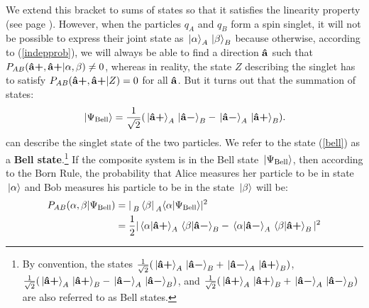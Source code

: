 %
We extend this bracket to sums of states so that it satisfies the linearity property (see page \pageref{linearity}).
However, when the particles $q_A$ and $q_B$ form a spin singlet, it will not be possible to express their joint state as $\ket*{\alpha}_A\ket*{\beta}_B$ because otherwise, according to (\ref{indepprob}), we will always be able to find a direction $\vb{\hat{{a}}}$ such that $P_{AB}({\vb{\hat{{a}}}\bm{+}}, {\vb{\hat{{a}}}\bm{+}}|\alpha, \beta)\neq 0$, whereas in reality, the state $Z$ describing the singlet has to satisfy $P_{AB}({\vb{\hat{{a}}}\bm{+}}, {\vb{\hat{{a}}}\bm{+}}|Z)=0$ for all  $\vb{\hat{{a}}}$.
But it turns out that the summation of states:
\begin{equation}\label{bell}
    \ket*{\Psi_{\text{Bell}}}=\frac{1}{\sqrt{2}}(\ket*{{\vb{\hat{{a}}}\bm{+}}}_A\ket*{{\vb{\hat{{a}}}\bm{-}}}_B-\ket*{{\vb{\hat{{a}}}\bm{-}}}_A\ket*{{\vb{\hat{{a}}}\bm{+}}}_B).
\end{equation} %
%
can describe the singlet state of the two particles. We refer to the state (\ref{bell}) as a \textbf{Bell state}.\footnote{By convention, the states $ \frac{1}{\sqrt{2}}(\ket*{{\vb{\hat{{a}}}\bm{+}}}_A\ket*{{\vb{\hat{{a}}}\bm{-}}}_B+\ket*{{\vb{\hat{{a}}}\bm{-}}}_A\ket*{{\vb{\hat{{a}}}\bm{+}}}_B)$, $ \frac{1}{\sqrt{2}}(\ket*{{\vb{\hat{{a}}}\bm{+}}}_A\ket*{{\vb{\hat{{a}}}\bm{+}}}_B-\ket*{{\vb{\hat{{a}}}\bm{-}}}_A\ket*{{\vb{\hat{{a}}}\bm{-}}}_B)$, and $ \frac{1}{\sqrt{2}}(\ket*{{\vb{\hat{{a}}}\bm{+}}}_A\ket*{{\vb{\hat{{a}}}\bm{+}}}_B+\ket*{{\vb{\hat{{a}}}\bm{-}}}_A\ket*{{\vb{\hat{{a}}}\bm{-}}}_B)$ are also referred to as Bell states.} If the composite system is in the Bell state $\ket*{\Psi_{\text{Bell}}}$, then according to the Born Rule, the probability that Alice measures her particle to be in state $\ket*{\alpha}$ and Bob measures his particle to be in the state $\ket*{\beta}$ will be:
\begin{equation}
\begin{split}
    P_{AB}(\alpha, \beta|\Psi_{\text{Bell}})&=|\prescript{}{B}{ \bra*{\beta}}\prescript{}{A}{ \ip{\alpha}{\Psi_{\text{Bell}}}}|^2\\
        &=\frac{1}{2}|\ip*{\alpha}{\uvbp{a}}_A\ip*{\beta}{\uvbm{a}}_B-\ip*{\alpha}{\uvbm{a}}_A\ip*{\beta}{\uvbp{a}}_B|^2
\end{split}
\end{equation}
